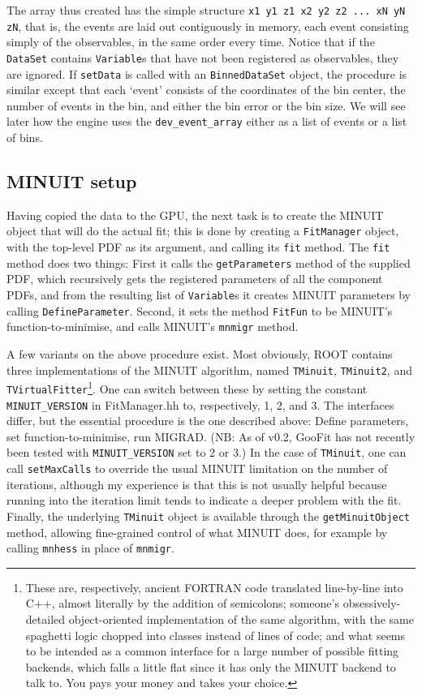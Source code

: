 \documentclass[12pt,pdflatex]{article}
\begin{document}
The array thus created has the simple structure \verb|x1 y1 z1 x2 y2 z2 ... xN yN zN|,
that is, the events are laid out contiguously in memory, each event consisting simply
of the observables, in the same order every time. Notice that if the \texttt{DataSet} contains \texttt{Variable}s
that have not been registered as observables, they are ignored. 
If \texttt{setData}
is called with an \texttt{BinnedDataSet} object, the procedure is similar
except that each `event' consists of the coordinates of the bin center, the
number of events in the bin, and either the bin error or the bin size. We will
see later how the engine uses the \texttt{dev_event_array} either as a list
of events or a list of bins. 

\subsection{MINUIT setup} 

Having copied the data to the GPU, the next task is to create the MINUIT object
that will do the actual fit; this is done by creating a \texttt{FitManager} object,
with the top-level PDF as its argument, and calling its \texttt{fit} method. 
The \texttt{fit} method does two things: First it calls the \texttt{getParameters}
method of the supplied PDF, which recursively gets the registered parameters of
all the component PDFs, and from the resulting list of \texttt{Variable}s it creates
MINUIT parameters by calling \texttt{DefineParameter}. Second, it sets the method
\texttt{FitFun} to be MINUIT's function-to-minimise, and calls MINUIT's \texttt{mnmigr}
method. 

A few variants on the above procedure exist. Most obviously, ROOT contains three 
implementations of the MINUIT algorithm, named \texttt{TMinuit}, \texttt{TMinuit2}, 
and \texttt{TVirtualFitter}\footnote{These are, respectively, ancient FORTRAN code
translated line-by-line into C++, almost literally by the addition of semicolons; 
someone's obsessively-detailed object-oriented
implementation of the same algorithm, with the same spaghetti logic chopped into
classes instead of lines of code; and what seems to be intended as a common interface
for a large number of possible fitting backends, which falls a little flat since it
has only the MINUIT backend to talk to. You pays your money and takes your choice.}. 
One can switch between these by setting the constant 
\texttt{MINUIT\_VERSION} in FitManager.hh to, respectively, 1, 2, and 3. The interfaces differ,
but the essential procedure is the one described above: Define parameters, set
function-to-minimise, run MIGRAD. (NB: As of v0.2, GooFit has not recently been
tested with \texttt{MINUIT\_VERSION} set to 2 or 3.) In the case of \texttt{TMinuit},
one can call \texttt{setMaxCalls} to override the usual MINUIT limitation on the
number of iterations, although my experience is that this is not usually helpful
because running into the iteration limit tends to indicate a deeper problem with
the fit. Finally, the underlying \texttt{TMinuit} object is available through the
\texttt{getMinuitObject} method, allowing fine-grained control of what MINUIT does, 
for example by calling \texttt{mnhess} in place of \texttt{mnmigr}.
\end{document}
